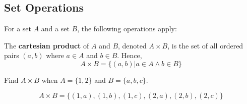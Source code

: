 \subsection{Set Operations}

For a set $A$ and a set $B$, the following operations apply:

The \textbf{cartesian product} of $A$ and $B$, denoted $A \times B$, is the set of all ordered pairs $(a, b)$ where $a \in A$ and $b \in B$. Hence,
\[ A \times B = \big\{ (a,b) | a \in A \land b \in B \big\} \]

\begin{ex}
  Find $A \times B$ when $A = \{ 1,2 \} $ and $B = \{ a, b, c\} $.
  \begin{sol}
    \[A \times B = \big\{(1,a),(1,b),(1,c),
    (2,a),(2,b),(2,c)\big\}\]
  \end{sol}
\end{ex}

